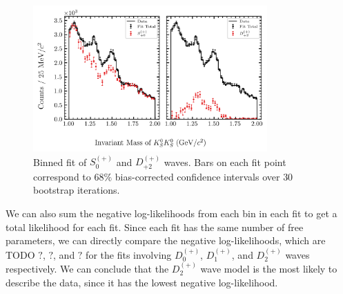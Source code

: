 \begin{figure}
  \begin{center}
    \includegraphics[width=0.8\textwidth]{figures/binned_fit_chisqdof_3.4_splot_D_1s_2b_phase_factor_waves491_uncertainty_bootstrap-CI-BC.png}
  \end{center}
  \caption{Binned fit of $S_{0}^{(+)}$ and $D_{+2}^{(+)}$ waves. Bars on each fit point correspond to $68\%$ bias-corrected confidence intervals over $ 30 $ bootstrap iterations.}\label{fig:binned-fit-chisqdof-3.4-Sp-D2p}
\end{figure}

We can also sum the negative log-likelihoods from each bin in each fit to get a total likelihood for each fit. Since each fit has the same number of free parameters, we can directly compare the negative log-likelihoods, which are {\color{red}TODO} $?$, $?$, and $?$ for the fits involving $D_0^{(+)}$, $D_1^{(+)}$, and $D_2^{(+)}$ waves respectively. We can conclude that the $D_2^{(+)}$ wave model is the most likely to describe the data, since it has the lowest negative log-likelihood.

